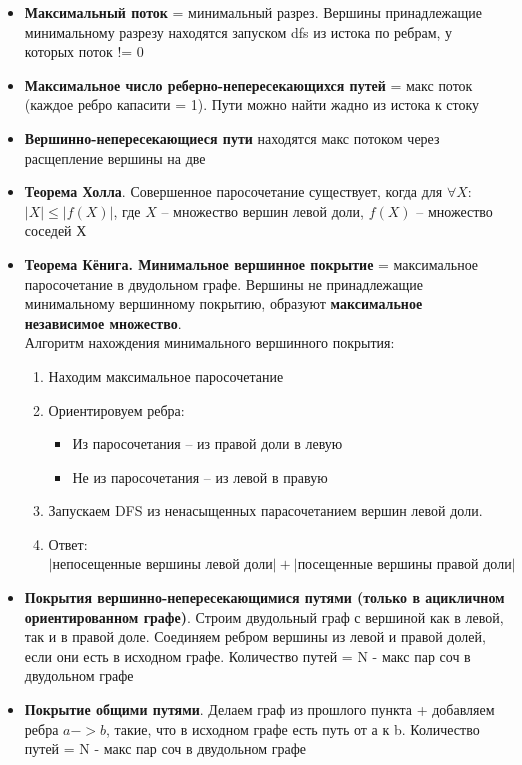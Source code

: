 \documentclass[10pt]{article}
\begin{document}
\begin{itemize}
\begin{itemize}
\end{itemize}
\item \textbf{Максимальный поток} = минимальный разрез. Вершины принадлежащие минимальному разрезу находятся запуском dfs из истока по ребрам, у которых поток != 0
\item \textbf{Максимальное число реберно-непересекающихся путей} = макс поток (каждое ребро капасити = 1). Пути можно найти жадно из истока к стоку
\item \textbf{Вершинно-непересекающиеся пути} находятся макс потоком через расщепление вершины на две
\item \textbf{Теорема Холла}. Совершенное паросочетание существует, когда для $\forall X$:
$\left|X\right| \le \left|f(X) \right|$, где $X$ -- множество вершин левой доли, $f(X)$ -- множество соседей Х
\item \textbf{Теорема Кёнига. Минимальное вершинное покрытие} = максимальное паросочетание в двудольном графе. 
Вершины не принадлежащие минимальному вершинному покрытию, образуют 
\textbf{максимальное независимое множество}.\\
Алгоритм нахождения минимального вершинного покрытия:
\begin{enumerate}
  \item Находим максимальное паросочетание
  \item Ориентировуем ребра:
  \begin{itemize}
    \item Из паросочетания -- из правой доли в левую
    \item Не из паросочетания -- из левой в правую
  \end{itemize}
  \item Запускаем DFS из ненасыщенных парасочетанием вершин левой доли.
  \item Ответ: $\left|\text{непосещенные вершины левой доли}\right| + \left|\text{посещенные вершины правой доли}\right|$
\end{enumerate}
\item \textbf{Покрытия вершинно-непересекающимися путями (только в ацикличном ориентированном графе)}.
Строим двудольный граф с вершиной как в левой, так и в правой доле.
Соединяем ребром вершины из левой и правой долей, если они есть в исходном графе.
Количество путей = N - макс пар соч в двудольном графе
\item \textbf{Покрытие общими путями}.
Делаем граф из прошлого пункта + добавляем ребра $a->b$, такие, что
в исходном графе есть путь от а к b. Количество путей = N - макс пар соч в двудольном графе

\end{itemize}
\end{document}
